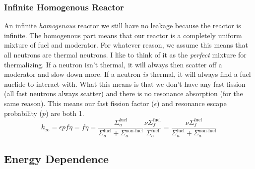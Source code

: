 \documentclass[letter]{article}
\begin{document}
\subsubsection{Infinite Homogenous Reactor}
An infinite \textit{homogenous} reactor we still have no leakage
because the reactor is infinite. The homogenous part means that our
reactor is a completely uniform mixture of fuel and
moderator.\cite[Lec. 10]{lecture}  For
whatever reason, we assume this means that all neutrons are thermal
neutrons. I like to think of it as the \textit{perfect} mixture for
thermalizing. If a neutron isn't thermal, it will always then scatter
off a moderator and slow down more. If a neutron \textit{is} thermal,
it will always find a fuel nuclide to interact with. What this means
is that we don't have any fast fission (all fast neutrons always
scatter) and there is no resonance absorption (for the same
reason). This means our fast fission factor ($\epsilon$) and resonance
escape probability ($p$) are both 1.
\begin{equation*}
  k_\infty=\epsilon{}pf\eta=f\eta=\frac{\Sigma^{\text{fuel}}_a}{\Sigma^{\text{fuel}}_a+\Sigma^{\text{non-fuel}}_a}\frac{\nu\Sigma_f^{\text{fuel}}}{\Sigma_a^{\text{fuel}}}=\frac{\nu\Sigma^{\text{fuel}}_f}{\Sigma^{\text{fuel}}_a+\Sigma^{\text{non-fuel}}_a}
\end{equation*}

\subsection{Energy Dependence}





\end{document}
